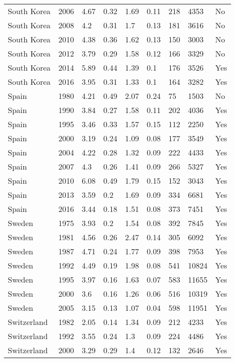 \begin{tabular}{lllllllll}
South Korea & 2006 & 4.67 & 0.32 & 1.69 & 0.11 & 218 & 4353 & No \\ 
South Korea & 2008 & 4.2 & 0.31 & 1.7 & 0.13 & 181 & 3616 & No \\ 
South Korea & 2010 & 4.38 & 0.36 & 1.62 & 0.13 & 150 & 3003 & No \\ 
South Korea & 2012 & 3.79 & 0.29 & 1.58 & 0.12 & 166 & 3329 & No \\ 
South Korea & 2014 & 5.89 & 0.44 & 1.39 & 0.1 & 176 & 3526 & Yes \\ 
South Korea & 2016 & 3.95 & 0.31 & 1.33 & 0.1 & 164 & 3282 & Yes \\ 
Spain & 1980 & 4.21 & 0.49 & 2.07 & 0.24 & 75 & 1503 & No \\ 
Spain & 1990 & 3.84 & 0.27 & 1.58 & 0.11 & 202 & 4036 & Yes \\ 
Spain & 1995 & 3.46 & 0.33 & 1.57 & 0.15 & 112 & 2250 & Yes \\ 
Spain & 2000 & 3.19 & 0.24 & 1.09 & 0.08 & 177 & 3549 & Yes \\ 
Spain & 2004 & 4.22 & 0.28 & 1.32 & 0.09 & 222 & 4433 & Yes \\ 
Spain & 2007 & 4.3 & 0.26 & 1.41 & 0.09 & 266 & 5327 & Yes \\ 
Spain & 2010 & 6.08 & 0.49 & 1.79 & 0.15 & 152 & 3043 & Yes \\ 
Spain & 2013 & 3.59 & 0.2 & 1.69 & 0.09 & 334 & 6681 & Yes \\ 
Spain & 2016 & 3.44 & 0.18 & 1.51 & 0.08 & 373 & 7451 & Yes \\ 
Sweden & 1975 & 3.93 & 0.2 & 1.54 & 0.08 & 392 & 7845 & Yes \\ 
Sweden & 1981 & 4.56 & 0.26 & 2.47 & 0.14 & 305 & 6092 & Yes \\ 
Sweden & 1987 & 4.71 & 0.24 & 1.77 & 0.09 & 398 & 7953 & Yes \\ 
Sweden & 1992 & 4.49 & 0.19 & 1.98 & 0.08 & 541 & 10824 & Yes \\ 
Sweden & 1995 & 3.97 & 0.16 & 1.63 & 0.07 & 583 & 11655 & Yes \\ 
Sweden & 2000 & 3.6 & 0.16 & 1.26 & 0.06 & 516 & 10319 & Yes \\ 
Sweden & 2005 & 3.15 & 0.13 & 1.07 & 0.04 & 598 & 11951 & Yes \\ 
Switzerland & 1982 & 2.05 & 0.14 & 1.34 & 0.09 & 212 & 4233 & Yes \\ 
Switzerland & 1992 & 3.55 & 0.24 & 1.3 & 0.09 & 224 & 4486 & Yes \\ 
Switzerland & 2000 & 3.29 & 0.29 & 1.4 & 0.12 & 132 & 2646 & Yes \\ 

\end{tabular}
